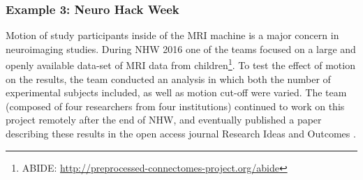 \subsubsection*{Example 3: Neuro Hack Week}
Motion of study participants inside of the MRI machine is a major concern in neuroimaging studies.
During NHW 2016 one of the teams focused on a large and openly available data-set of MRI data from children\footnote{ABIDE: \url{http://preprocessed-connectomes-project.org/abide}}.
To test the effect of motion on the results, the team conducted an analysis in which both the number of experimental subjects included, as well as motion cut-off were varied.
The team (composed of four researchers from four institutions) continued to work on this project remotely after the end of NHW, and eventually published a paper describing these results in the open access journal Research Ideas and Outcomes \cite{leonard2017}.

